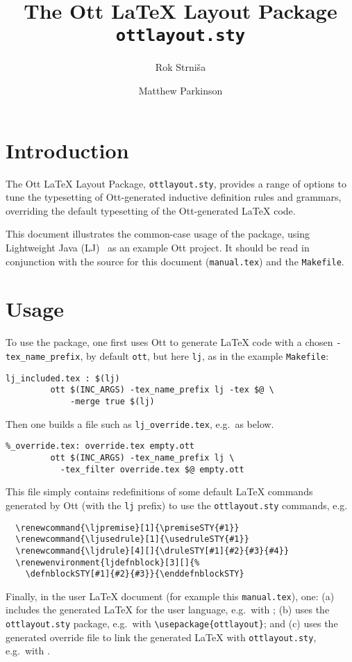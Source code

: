 \documentclass{article}
\title{The Ott \LaTeX{} Layout Package \texttt{ottlayout.sty}}
\author{Rok Strni\v sa \and Matthew Parkinson}
\begin{document}
\maketitle

\section{Introduction}
%

The Ott \LaTeX{} Layout Package, \texttt{ottlayout.sty}, provides a
range of options to tune the typesetting of 
Ott-generated inductive definition rules and grammars, overriding the
default typesetting of the Ott-generated \LaTeX{} code.

This document illustrates the common-case usage of the package, using
Lightweight Java (LJ)~\cite{lj} as an example Ott project.
It should be read in conjunction with the source for this document (\verb+manual.tex+) and the \verb+Makefile+.

\section{Usage}
To use the package, one first uses Ott to generate \LaTeX{} code with
a chosen \verb+-tex_name_prefix+, by default \verb+ott+, but here
\verb+lj+, as in the example \verb+Makefile+:
\begin{verbatim}
lj_included.tex : $(lj)
         ott $(INC_ARGS) -tex_name_prefix lj -tex $@ \
             -merge true $(lj)
\end{verbatim}
Then one builds a file such as \verb+lj_override.tex+, e.g.~as below.
\begin{verbatim}
%_override.tex: override.tex empty.ott
         ott $(INC_ARGS) -tex_name_prefix lj \
           -tex_filter override.tex $@ empty.ott
\end{verbatim}
This file simply contains redefinitions of some default \LaTeX{}
commands generated by Ott (with the \verb+lj+ prefix) to use the
\texttt{ottlayout.sty} commands, e.g.
\begin{verbatim}
  \renewcommand{\ljpremise}[1]{\premiseSTY{#1}}
  \renewcommand{\ljusedrule}[1]{\usedruleSTY{#1}}
  \renewcommand{\ljdrule}[4][]{\druleSTY[#1]{#2}{#3}{#4}}
  \renewenvironment{ljdefnblock}[3][]{%
    \defnblockSTY[#1]{#2}{#3}}{\enddefnblockSTY}
\end{verbatim}
Finally, in the user \LaTeX{} document (for example this
\texttt{manual.tex}), one:
(a) includes the generated \LaTeX{} for the user language, e.g.~with
\verb++;
(b) uses the \texttt{ottlayout.sty} package, e.g.~with
\verb+\usepackage{ottlayout}+; and
(c) uses the generated override file to link the generated \LaTeX{}
with \verb+ottlayout.sty+, e.g.~with
\verb++.
\end{document}
